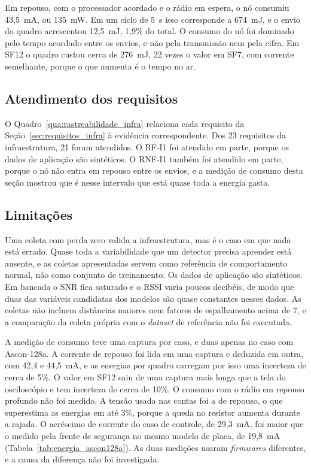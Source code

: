 Em repouso, com o processador acordado e o rádio em espera, o nó consumiu 43,5~mA, ou 135~mW. Em um ciclo de 5~s isso corresponde a 674~mJ, e o envio do quadro acrescentou 12,5~mJ, 1,9\% do total. O consumo do nó foi dominado pelo tempo acordado entre os envios, e não pela transmissão nem pela cifra. Em SF12 o quadro custou cerca de 276~mJ, 22 vezes o valor em SF7, com corrente semelhante, porque o que aumenta é o tempo no ar.

\subsection{Atendimento dos requisitos}

O Quadro~\ref{qua:rastreabilidade_infra} relaciona cada requisito da Seção~\ref{sec:requisitos_infra} à evidência correspondente. Dos 23 requisitos da infraestrutura, 21 foram atendidos. O RF-I1 foi atendido em parte, porque os dados de aplicação são sintéticos. O RNF-I1 também foi atendido em parte, porque o nó não entra em repouso entre os envios, e a medição de consumo desta seção mostrou que é nesse intervalo que está quase toda a energia gasta.

\subsection{Limitações}

Uma coleta com perda zero valida a infraestrutura, mas é o caso em que nada está errado. Quase toda a variabilidade que um detector precisa aprender está ausente, e as coletas apresentadas servem como referência de comportamento normal, não como conjunto de treinamento. Os dados de aplicação são sintéticos. Em bancada o SNR fica saturado e o RSSI varia poucos decibéis, de modo que duas das variáveis candidatas dos modelos são quase constantes nesses dados. As coletas não incluem distâncias maiores nem fatores de espalhamento acima de 7, e a comparação da coleta própria com o \textit{dataset} de referência não foi executada.

A medição de consumo teve uma captura por caso, e duas apenas no caso com Ascon-128a. A corrente de repouso foi lida em uma captura e deduzida em outra, com 42,4 e 44,5~mA, e as energias por quadro carregam por isso uma incerteza de cerca de 5\%. O valor em SF12 saiu de uma captura mais longa que a tela do osciloscópio e tem incerteza de cerca de 10\%. O consumo com o rádio em repouso profundo não foi medido. A tensão usada nas contas foi a de repouso, o que superestima as energias em até 3\%, porque a queda no resistor aumenta durante a rajada. O acréscimo de corrente do caso de controle, de 29,3~mA, foi maior que o medido pela frente de segurança no mesmo modelo de placa, de 19,8~mA (Tabela~\ref{tab:energia_ascon128a}). As duas medições usaram \textit{firmwares} diferentes, e a causa da diferença não foi investigada.

